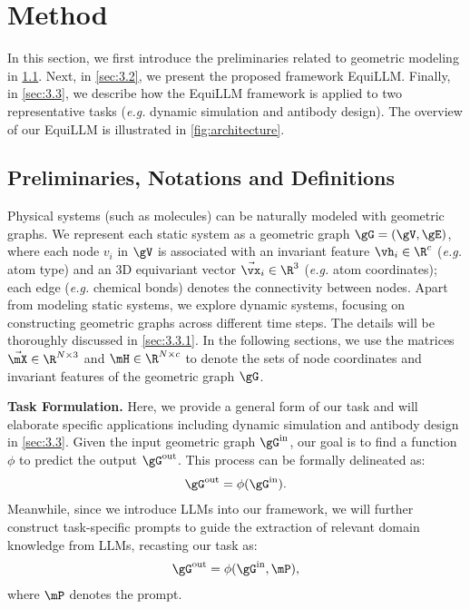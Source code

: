 \section{Method}
In this section, we first introduce the preliminaries related to geometric modeling in \cref{sec:3.1}. Next, in \cref{sec:3.2}, we present the proposed framework EquiLLM. Finally, in \cref{sec:3.3}, we describe how the EquiLLM framework is applied to two representative tasks (\emph{e.g.} dynamic simulation and antibody design). The overview of our EquiLLM is illustrated in \cref{fig:architecture}.

\subsection{Preliminaries, Notations and Definitions}
\label{sec:3.1}
Physical systems (such as molecules) can be naturally modeled with geometric graphs. We represent each static system as a geometric graph $\gG = (\gV,\gE)$, where each node $v_i$ in $\gV$ is associated with an invariant feature $\vh_{i}\in\R^c$ (\emph{e.g.} atom type) and an 3D equivariant vector $\vec{\vx}_{i}\in\R^3$ (\emph{e.g.} atom coordinates); each edge (\emph{e.g.} chemical bonds) denotes the connectivity between nodes. Apart from modeling static systems, we explore dynamic systems, focusing on constructing geometric graphs across different time steps. The details will be thoroughly discussed in \cref{sec:3.3.1}. In the following sections, we use the matrices $\Vec{\mX}\in\R^{N \times 3}$ and $\mH\in\R^{N \times c}$ to denote the sets of node coordinates and invariant features of the geometric graph $\gG$.

\textbf{Task Formulation.} Here, we provide a general form of our task and will elaborate specific applications including dynamic simulation and antibody design in \cref{sec:3.3}. Given the input geometric graph $\gG^{\text{in}}$, our goal is to find a function $\phi$ to predict the output $\gG^{\text{out}}$. This process can be formally delineated as:
\begin{equation}\label{eq:task_general}
\begin{aligned}
    &\gG^{\text{out}} = \phi(\gG^{\text{in}}). \\
\end{aligned}
\end{equation}
Meanwhile, since we introduce LLMs into our framework, we will further construct task-specific prompts to guide the extraction of relevant domain knowledge from LLMs, recasting our task as:
\begin{equation}\label{eq:dynamic2}
\begin{aligned}
    &\gG^{\text{out}} = \phi(\gG^{\text{in}}, \mP), \\
\end{aligned}
\end{equation}
where $\mP$ denotes the prompt.

